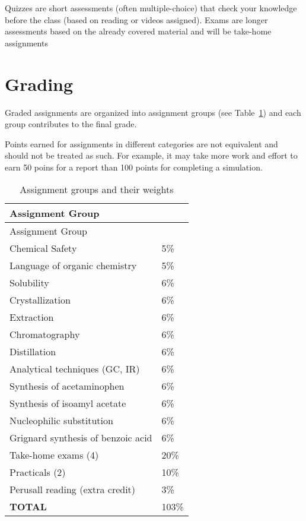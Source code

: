 Quizzes are short assessments (often multiple-choice) that check your
knowledge before the class (based on reading or videos assigned). Exams
are longer assessments based on the already covered material and will be
take-home assignments

\hypertarget{sec:grading}{%
\section{Grading}\label{sec:grading}}

Graded assignments are organized into assignment groups (see
Table~\ref{tbl:assignments}) and each group contributes to the final
grade.

Points earned for assignments in different categories are not equivalent
and should not be treated as such. For example, it may take more work
and effort to earn 50 poins for a report than 100 points for completing
a simulation.

\hypertarget{tbl:assignments}{}
\begin{longtable}[]{@{}ll@{}}
\caption{\label{tbl:assignments}Assignment groups and their
weights}\tabularnewline
\toprule
Assignment Group & \\
\midrule
\endfirsthead
\toprule
Assignment Group & \\
\midrule
\endhead
Chemical Safety & 5\% \\
Language of organic chemistry & 5\% \\
Solubility & 6\% \\
Crystallization & 6\% \\
Extraction & 6\% \\
Chromatography & 6\% \\
Distillation & 6\% \\
Analytical techniques (GC, IR) & 6\% \\
Synthesis of acetaminophen & 6\% \\
Synthesis of isoamyl acetate & 6\% \\
Nucleophilic substitution & 6\% \\
Grignard synthesis of benzoic acid & 6\% \\
Take-home exams (4) & 20\% \\
Practicals (2) & 10\% \\
Perusall reading (extra credit) & 3\% \\
\textbf{TOTAL} & 103\% \\
\bottomrule
\end{longtable}

